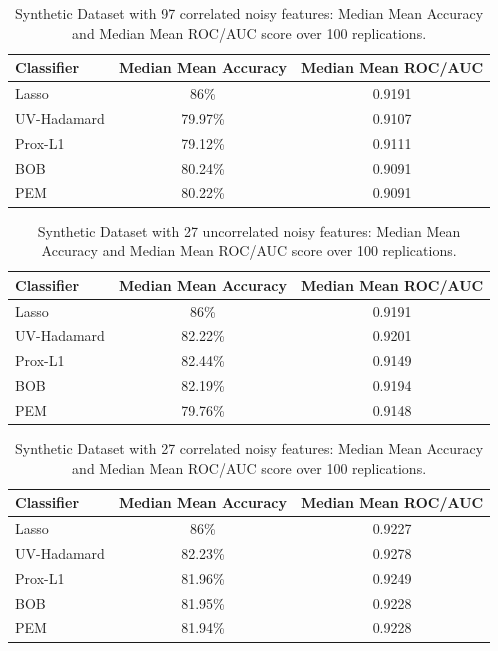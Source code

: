 \documentclass[11pt, twoside]{report}
\begin{document}
\begin{table}[h!]
    \centering
    \begin{tabular}{l c c}
        \hline
        \textbf{Classifier} & \textbf{Median Mean Accuracy} & \textbf{Median Mean ROC/AUC} \\
        \hline
        Lasso & 86\%  & 0.9191  \\
        UV-Hadamard & 79.97\%  & 0.9107  \\
        Prox-L1       & 79.12\%  & 0.9111  \\
        BOB                 & 80.24\%  & 0.9091  \\
        PEM      & 80.22\%  & 0.9091  \\
        \hline
    \end{tabular}
    \caption{Synthetic Dataset with 97 correlated noisy features: Median Mean Accuracy and Median Mean ROC/AUC score over 100 replications.}
    \label{tab:train_test_accuracy_binary_corr}
\end{table}

\begin{table}[h!]
    \centering
    \begin{tabular}{l c c}
        \hline
        \textbf{Classifier} & \textbf{Median Mean Accuracy} & \textbf{Median Mean ROC/AUC} \\
        \hline
        Lasso & 86\%  & 0.9191  \\
        UV-Hadamard & 82.22\%  & 0.9201  \\
        Prox-L1       & 82.44\%  & 0.9149  \\
        BOB                 & 82.19\%  & 0.9194  \\
        PEM      & 79.76\%  & 0.9148  \\
        \hline
    \end{tabular}
    \caption{Synthetic Dataset with 27 uncorrelated noisy features: Median Mean Accuracy and Median Mean ROC/AUC score over 100 replications.}
    \label{tab:train_test_accuracy_binary_small_uncorr}
\end{table}

\begin{table}[h!]
    \centering
    \begin{tabular}{l c c}
        \hline
        \textbf{Classifier} & \textbf{Median Mean Accuracy} & \textbf{Median Mean ROC/AUC} \\
        \hline
        Lasso & 86\%  & 0.9227  \\
        UV-Hadamard & 82.23\%  & 0.9278  \\
        Prox-L1       & 81.96\%  & 0.9249  \\
        BOB                 & 81.95\%  & 0.9228  \\
        PEM      & 81.94\%  & 0.9228  \\
        \hline
    \end{tabular}
    \caption{Synthetic Dataset with 27 correlated noisy features: Median Mean Accuracy and Median Mean ROC/AUC score over 100 replications.}
    \label{tab:train_test_accuracy_binary_small_corr}
\end{table}
\end{document}
